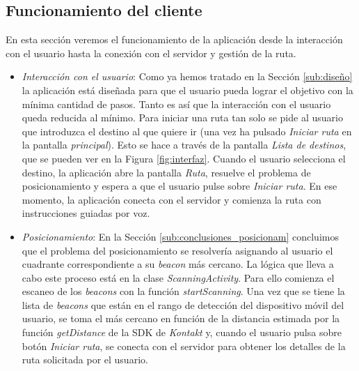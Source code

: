\subsection{Funcionamiento del cliente}
\label{sub:func_cliente}
En esta sección veremos el funcionamiento de la aplicación desde la interacción con el usuario hasta la conexión con el servidor y gestión de la ruta. 

\begin{itemize}
	\item \textit{Interacción con el usuario}: Como ya hemos tratado en la Sección \ref{sub:diseño} la aplicación está diseñada para que el usuario pueda lograr el objetivo con la mínima cantidad de pasos. Tanto es así que la interacción con el usuario queda reducida al mínimo. Para iniciar una ruta tan solo se pide al usuario que introduzca el destino al que quiere ir (una vez ha pulsado \textit{Iniciar ruta} en la pantalla \textit{principal}). Esto se hace a través de la pantalla \textit{Lista de destinos}, que se pueden ver en la Figura \ref{fig:interfaz}. Cuando el usuario selecciona el destino, la aplicación abre la pantalla \textit{Ruta}, resuelve el problema de posicionamiento y espera a que el usuario pulse sobre \textit{Iniciar ruta}. En ese momento, la aplicación conecta con el servidor y comienza la ruta con instrucciones guiadas por voz.
	
	\item \textit{Posicionamiento}: En la Sección \ref{sub:conclusiones_posicionam} concluimos que el problema del posicionamiento se resolvería asignando al usuario el cuadrante correspondiente a su \textit{beacon} más cercano. La lógica que lleva a cabo este proceso está en la clase \textit{ScanningActivity}. Para ello comienza el escaneo de los \textit{beacons} con la función \textit{startScanning}. Una vez que se tiene la lista de \textit{beacons} que están en el rango de detección del dispositivo móvil del usuario, se toma el más cercano en función de la distancia estimada por la función \textit{getDistance} de la SDK de \textit{Kontakt} y, cuando el usuario pulsa sobre botón \textit{Iniciar ruta}, se conecta con el servidor para obtener los detalles de la ruta solicitada por el usuario. 
	

\end{itemize}
